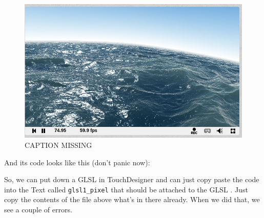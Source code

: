 \begin{figure}[H]
	\centering
	\includegraphics[width=\textwidth]{img/sea.png}
	\caption[shortCaption]
	{CAPTION MISSING}
	\label{fig:label}
\end{figure}

And its code looks like this (don't panic now):




So, we can put down a GLSL \TOP in TouchDesigner and can just copy paste the code into the Text \DAT called \texttt{glsl1\_pixel} that should be attached to the GLSL \TOP. Just copy the contents of the file above what's in there already. When we did that, we see a couple of errors.


